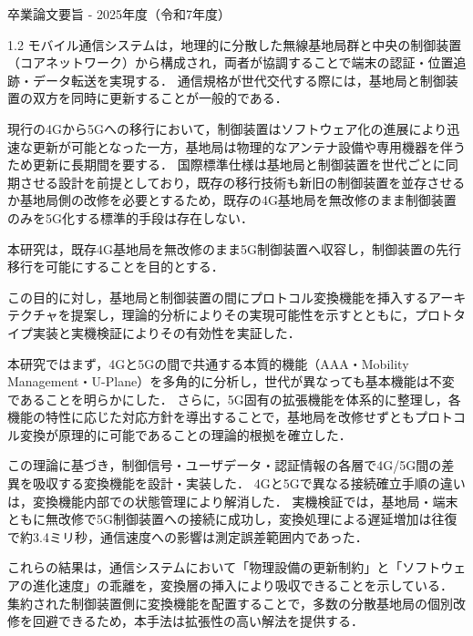 卒業論文要旨 - 2025年度（令和7年度）
\begin{center}
\begin{large}
\end{large}
\end{center}
\begin{spacing}{1.2}
\small
モバイル通信システムは，地理的に分散した無線基地局群と中央の制御装置（コアネットワーク）から構成され，両者が協調することで端末の認証・位置追跡・データ転送を実現する．
通信規格が世代交代する際には，基地局と制御装置の双方を同時に更新することが一般的である．

現行の4Gから5Gへの移行において，制御装置はソフトウェア化の進展により迅速な更新が可能となった一方，基地局は物理的なアンテナ設備や専用機器を伴うため更新に長期間を要する．
国際標準仕様は基地局と制御装置を世代ごとに同期させる設計を前提としており，既存の移行技術も新旧の制御装置を並存させるか基地局側の改修を必要とするため，既存の4G基地局を無改修のまま制御装置のみを5G化する標準的手段は存在しない．

本研究は，既存4G基地局を無改修のまま5G制御装置へ収容し，制御装置の先行移行を可能にすることを目的とする．

この目的に対し，基地局と制御装置の間にプロトコル変換機能を挿入するアーキテクチャを提案し，理論的分析によりその実現可能性を示すとともに，プロトタイプ実装と実機検証によりその有効性を実証した．

本研究ではまず，4Gと5Gの間で共通する本質的機能（AAA・Mobility Management・U-Plane）を多角的に分析し，世代が異なっても基本機能は不変であることを明らかにした．
さらに，5G固有の拡張機能を体系的に整理し，各機能の特性に応じた対応方針を導出することで，基地局を改修せずともプロトコル変換が原理的に可能であることの理論的根拠を確立した．

この理論に基づき，制御信号・ユーザデータ・認証情報の各層で4G/5G間の差異を吸収する変換機能を設計・実装した．
4Gと5Gで異なる接続確立手順の違いは，変換機能内部での状態管理により解消した．
実機検証では，基地局・端末ともに無改修で5G制御装置への接続に成功し，変換処理による遅延増加は往復で約3.4ミリ秒，通信速度への影響は測定誤差範囲内であった．

これらの結果は，通信システムにおいて「物理設備の更新制約」と「ソフトウェアの進化速度」の乖離を，変換層の挿入により吸収できることを示している．
集約された制御装置側に変換機能を配置することで，多数の分散基地局の個別改修を回避できるため，本手法は拡張性の高い解法を提供する．


\end{spacing}
